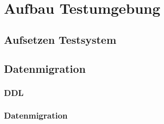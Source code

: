 \chapter[Migration]{Aufbau Testumgebung}


\section[Db2W]{Aufsetzen Testsystem}

\loreipsum


\section{Datenmigration}

\subsection{DDL}

\loreipsum


\subsection{Datenmigration}

